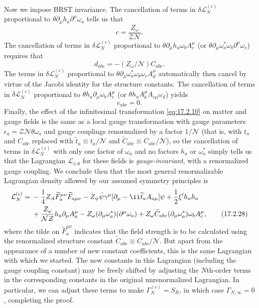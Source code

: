 Now we impose BRST invariance. The cancellation of terms in $\delta\mathcal L_N^{(\epsilon)}$ proportional to $\theta\partial_\mu h_a\partial^\mu\omega_a$ tells us that
\begin{equation}
c=\frac{Z_\omega}{\mathcal Z\mathcal N}.
\tag{17.2.25}\label{eq:17.2.25}
\end{equation}
The cancellation of terms in $\delta\mathcal L_N^{(\epsilon)}$ proportional to $\theta\partial_\mu h_a\omega_b A_c^\mu$ (or $\theta\partial_\mu\omega_a^*\omega_b\partial^\mu\omega_c$) requires that
\begin{equation}
d_{abc}=-(Z_\omega/\mathcal N)C_{abc}.
\tag{17.2.26}\label{eq:17.2.26}
\end{equation}
The terms in $\delta\mathcal L_N^{(\epsilon)}$ proportional to $\theta\partial_\mu\omega_a^*\omega_b\omega_c A_d^\mu$ automatically then cancel by virtue of the Jacobi identity for the structure constants. The cancellation of terms in $\delta\mathcal L_N^{(\epsilon)}$ proportional to $\theta h_a\partial_\mu\omega_b A_c^\mu$ (or $\theta h_a A_b^\mu A_{c\mu}\omega_d$) yields
\begin{equation}
e_{abc}=0.
\tag{17.2.27}\label{eq:17.2.27}
\end{equation}
Finally, the effect of the infinitesimal transformation \eqref{eq:17.2.10} on matter and gauge fields is the same as a local gauge transformation with gauge parameters $\epsilon_a=\mathcal Z\mathcal N\theta\omega_a$ and gauge couplings renormalized by a factor $1/\mathcal N$ (that is, with $t_a$ and $C_{abc}$ replaced with $\widetilde t_a\equiv t_a/\mathcal N$ and $\widetilde C_{abc}\equiv C_{abc}/\mathcal N$), so the cancellation of terms in $\delta\mathcal L_N^{(\epsilon)}$ with only one factor of $\omega_a$ and no factors $h_a$ or $\omega_a^*$ simply tells us that the Lagrangian $\mathcal L_{\psi A}$ for these fields is \emph{gauge-invariant}, with a renormalized gauge coupling. We conclude then that the most general renormalizable Lagrangian density allowed by our assumed symmetry principles is
\begin{align}
\mathcal L_N^{(\epsilon)}={}&-\frac14Z_A\widetilde F_a^{\mu\nu}\widetilde F_{a\mu\nu}
-Z_\psi\bar\psi\gamma^\mu[\partial_\mu-\ii\widetilde t_a A_{a\mu}]\psi
+\frac12\xi'h_a h_a
\notag\\
&+\frac{Z_\omega}{\mathcal N\mathcal Z}h_a\partial_\mu A_a^\mu
-Z_\omega(\partial_\mu\omega_a^*)(\partial^\mu\omega_a)
+Z_\omega\widetilde C_{abc}(\partial_\mu\omega_a^*)\omega_b A_c^\mu,
\tag{17.2.28}\label{eq:17.2.28}
\end{align}
where the tilde on $\widetilde F_a^{\mu\nu}$ indicates that the field strength is to be calculated using the renormalized structure constant $\widetilde C_{abc}\equiv C_{abc}/\mathcal N$. But apart from the appearance of a number of new constant coefficients, this is the same Lagrangian with which we started. The new constants in this Lagrangian (including the gauge coupling constant) may be freely shifted by adjusting the $N$th-order terms in the corresponding constants in the original unrenormalized Lagrangian. In particular, we can adjust these terms to make $\Gamma_N^{(\epsilon)}=S_R$, in which case $\Gamma_{N,\infty}=0$, completing the proof.

